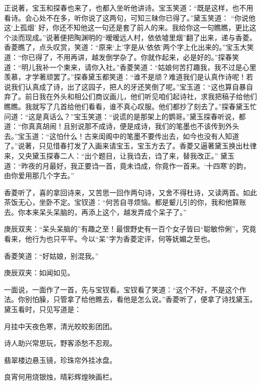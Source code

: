 \begin{parag}
    正说著，宝玉和探春也来了，也都入坐听他讲诗。宝玉笑道：“既是这样，也不用看诗。会心处不在多，听你说了这两句，可知三昧你已得了。”黛玉笑道： “你说他这‘上孤烟’ 好，你还不知他这一句还是套了前人的来。我给你这一句瞧瞧，更比这个淡而现成。”说著便把陶渊明的“暧暧远人村，依依墟里烟”翻了出来，递与香菱。香菱瞧了，点头叹赏，笑道：“原来‘上’字是从‘依依’两个字上化出来的。”宝玉大笑道：“你已得了，不用再讲，越发倒学杂了。你就作起来，必是好的。”探春笑道：“明儿我补一个柬来，请你入社。”香菱笑道：“姑娘何苦打趣我，我不过是心里羡慕，才学著顽罢了。”探春黛玉都笑道：“谁不是顽？难道我们是认真作诗呢！若说我们认真成了诗，出了这园子，把人的牙还笑倒了呢。”宝玉道：“这也算自暴自弃了。前日我在外头和相公们商议画儿，他们听见咱们起诗社，求我把稿子给他们瞧瞧。我就写了几首给他们看看，谁不真心叹服。他们都抄了刻去了。”探春黛玉忙问道：“这是真话么？”宝玉笑道：“说谎的是那架上的鹦哥。”黛玉探春听说，都道：“你真真胡闹！且别说那不成诗，便是成诗，我们的笔墨也不该传到外头去。”宝玉道：“这怕什么！古来闺阁中的笔墨不要传出去，如今也没有人知道了。”说著，只见惜春打发了入画来请宝玉，宝玉方去了。香菱又逼著黛玉换出杜律来，又央黛玉探春二人：“出个题目，让我诌去，诌了来，替我改正。” 黛玉道：“昨夜的月最好，我正要诌一首，竟未诌成，你竟作一首来。‘十四寒’的韵，由你爱用那几个字去。”
\end{parag}


\begin{parag}
    香菱听了，喜的拿回诗来，又苦思一回作两句诗，又舍不得杜诗，又读两首。如此茶饭无心，坐卧不定。宝钗道：“何苦自寻烦恼。都是颦儿引的你，我和他算账去。你本来呆头呆脑的，再添上这个，越发弄成个呆子了。”\begin{note}庚辰双夹：“呆头呆脑的”有趣之至！最恨野史有一百个女子皆曰“聪敏伶俐”，究竟看来，他行为也只平平。今以“呆”字为香菱定评，何等妩媚之至也。\end{note}香菱笑道：“好姑娘，别混我。”\begin{note}庚辰双夹：如闻如见。\end{note}一面说，一面作了一首，先与宝钗看。宝钗看了笑道：“这个不好，不是这个作法。你别怕臊，只管拿了给他瞧去，看他是怎么说。”香菱听了，便拿了诗找黛玉。黛玉看时，只见写道是：
\end{parag}


\begin{poem}
    \begin{pl}月挂中天夜色寒，清光皎皎影团团。 \end{pl}

    \begin{pl}诗人助兴常思玩，野客添愁不忍观。 \end{pl}

    \begin{pl}翡翠楼边悬玉镜，珍珠帘外挂冰盘。 \end{pl}

    \begin{pl}良宵何用烧银烛，晴彩辉煌映画栏。 \end{pl}
\end{poem}


